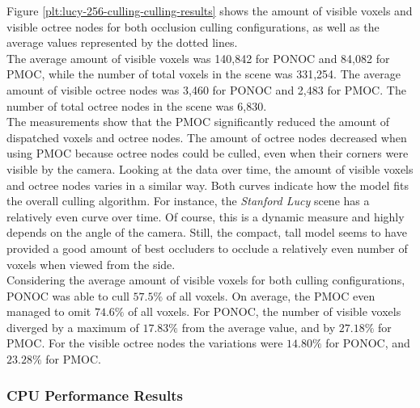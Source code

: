 
\noindent
Figure \ref{plt:lucy-256-culling-culling-results} shows the amount of visible voxels and visible octree 
nodes for both occlusion culling configurations, as well as the average values represented by the dotted 
lines. \\

\noindent
The average amount of visible voxels was 140,842 for \ac{PONOC} and 84,082 for \ac{PMOC}, 
while the number of total voxels in the scene was 331,254. The average amount of visible 
octree nodes was 3,460 for \ac{PONOC} and 2,483 for \ac{PMOC}. The number of total octree 
nodes in the scene was 6,830. \\

\noindent
The measurements show that the \ac{PMOC} significantly reduced the amount of dispatched voxels and octree nodes. 
The amount of octree nodes decreased when using \ac{PMOC} because octree nodes could be culled, even when their 
corners were visible by the camera. Looking at the data over time, the amount of visible voxels and octree nodes
varies in a similar way. Both curves indicate how the model fits the overall culling algorithm. For instance, 
the \emph{Stanford Lucy} scene has a relatively even curve over time. Of course, this is a dynamic measure and 
highly depends on the angle of the camera. Still, the compact, tall model seems to have provided a good amount of 
best occluders to occlude a relatively even number of voxels when viewed from the side. \\

Considering the average amount of visible voxels for both culling configurations, \ac{PONOC} was able to cull 
$57.5\%$ of all voxels. On average, the \ac{PMOC} even managed to omit $74.6\%$ of all voxels. For \ac{PONOC},
the number of visible voxels diverged by a maximum of $17.83\%$ from the average value, and by $27.18\%$ for \ac{PMOC}. 
For the visible octree nodes the variations were $14.80\%$ for \ac{PONOC}, and $23.28\%$ for \ac{PMOC}.

\subsubsection*{CPU Performance Results} \label{subsubsec-cpu-performance-results-lucy}

